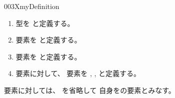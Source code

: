 \documentclass[index]{subfiles}
\begin{document}
\begin{myBlock}{003X}{myDefinition}
  \begin{enumerate}
  \item 型\myInlineMath{\myTruncLevel \myElemOf \myUniverse{\myLevelZero}}を
    \myInlineMath{\myNat \myCoproduct (\myUnitType \myCoproduct \myUnitType)}
    と定義する。
  \item 要素\myInlineMath{\myTLMinusTwo \myElemOf \myTruncLevel}を
    \myInlineMath{\myCoproductInII{\myCoproductInII{\myUnitElem}}}
    と定義する。
  \item 要素\myInlineMath{\myTLMinusOne \myElemOf \myTruncLevel}を
    \myInlineMath{\myCoproductInII{\myCoproductInI{\myUnitElem}}}
    と定義する。
  \item 要素に対して、
    要素を
    \myInlineMath{\myTLSucc{\myTLMinusTwo} \myDefEq \myTLMinusOne},
    \myInlineMath{\myTLSucc{\myTLMinusOne} \myDefEq \myCoproductInI{\myNatZero}},
    と定義する。
  \end{enumerate}
  要素に対しては、
  を省略して
  自身を\myInlineMath{\myTruncLevel}の要素とみなす。
\end{myBlock}
\end{document}
